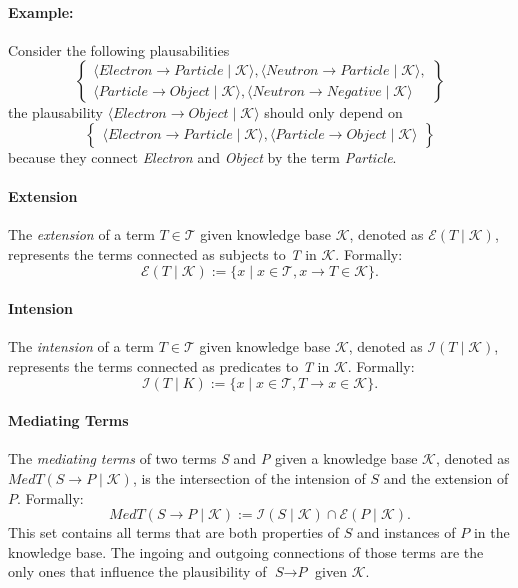 \documentclass{article}
\newcommand{\kb}[0]{\mathcal{K}}
\newcommand{\term}[1]{\textit{#1}}
\newcommand{\extension}[2]{\mathcal{E}(#1 \mid #2)}
\newcommand{\intension}[2]{\mathcal{I}(#1 \mid #2)}
\newcommand{\tstatement}[2]{\term{#1} \to \term{#2}}
\newcommand{\plausability}[3]{\langle\tstatement{#1}{#2} \mid \mathcal{#3}\rangle}
\begin{document}
\paragraph{Example:}
Consider the following plausabilities
$$
\left\{
\begin{array}{l}
    \plausability{Electron}{Particle}{K},
    \plausability{Neutron}{Particle}{K},\\
    \plausability{Particle}{Object}{K},
    \plausability{Neutron}{Negative}{K}
\end{array}
\right\}
$$
the plausability $\plausability{Electron}{Object}{K}$ should only depend on
$$
\left\{
\begin{array}{l}
    \plausability{Electron}{Particle}{K},
    \plausability{Particle}{Object}{K}
\end{array}
\right\}
$$
because they connect \term{Electron} and \term{Object} by the term \term{Particle}.

\paragraph{Extension}
The \textit{extension} of a term $T \in \mathcal{T}$ given knowledge base $\kb$, denoted as $\extension{T}{\kb}$, represents the terms connected as subjects to \term{T} in $\kb$. Formally:
\[
\extension{T}{\kb} := \{ x \mid x \in \mathcal{T}, \tstatement{x}{T} \in \kb \}.
\]

\paragraph{Intension}
The \textit{intension} of a term $T \in \mathcal{T}$ given knowledge base $\kb$, denoted as $\intension{T}{\kb}$, represents the terms connected as predicates to \term{T} in $\kb$. Formally:
\[
\intension{T}{K} := \{ x \mid x \in \mathcal{T}, \tstatement{T}{x} \in \kb \}.
\]

\paragraph{Mediating Terms}
The \textit{mediating terms} of two terms  \term{S} and \term{P} given a knowledge base $\kb$, denoted as $MedT(\tstatement{S}{P} \mid \kb)$, is the intersection of the intension of $S$ and the extension of $P$. Formally:
\[
MedT(S \to P \mid \mathcal{K}) := \intension{S}{\mathcal{K}} \cap \extension{P}{\mathcal{K}}.
\]
This set contains all terms that are both properties of $S$ and instances of $P$ in the knowledge base. The ingoing and outgoing connections of those terms are the only ones that influence the plausibility of $\tstatement{S}{P}$ given $\kb$.
\end{document}
